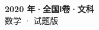 \documentclass[zihao=-4, a4paper]{ctexart}
\begin{document}
\begin{center}
  {\Large\bfseries 2020 年·全国Ⅰ卷·文科}\\[4pt]
  {\large 数学 · 试题版}
\end{center}
\medskip
{}

\end{document}
